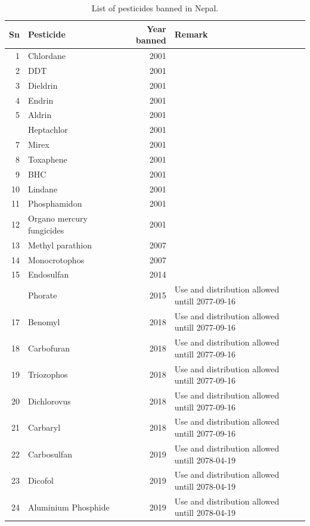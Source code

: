 \documentclass[
  openany]{book}
\begin{document}
\begin{table}

\caption{\label{tab:banned-pesticides}List of pesticides banned in Nepal.}
\centering
\begin{tabular}[t]{rlrl}
\toprule
Sn & Pesticide & Year banned & Remark\\
\midrule
\rowcolor{gray!6}  1 & Chlordane & 2001 & \\
2 & DDT & 2001 & \\
\rowcolor{gray!6}  3 & Dieldrin & 2001 & \\
4 & Endrin & 2001 & \\
\rowcolor{gray!6}  5 & Aldrin & 2001 & \\
\addlinespace
6 & Heptachlor & 2001 & \\
\rowcolor{gray!6}  7 & Mirex & 2001 & \\
8 & Toxaphene & 2001 & \\
\rowcolor{gray!6}  9 & BHC & 2001 & \\
10 & Lindane & 2001 & \\
\addlinespace
\rowcolor{gray!6}  11 & Phosphamidon & 2001 & \\
12 & Organo mercury fungicides & 2001 & \\
\rowcolor{gray!6}  13 & Methyl parathion & 2007 & \\
14 & Monocrotophos & 2007 & \\
\rowcolor{gray!6}  15 & Endosulfan & 2014 & \\
\addlinespace
16 & Phorate & 2015 & Use and distribution allowed untill 2077-09-16\\
\rowcolor{gray!6}  17 & Benomyl & 2018 & Use and distribution allowed untill 2077-09-16\\
18 & Carbofuran & 2018 & Use and distribution allowed untill 2077-09-16\\
\rowcolor{gray!6}  19 & Triozophos & 2018 & Use and distribution allowed untill 2077-09-16\\
20 & Dichlorovus & 2018 & Use and distribution allowed untill 2077-09-16\\
\addlinespace
\rowcolor{gray!6}  21 & Carbaryl & 2018 & Use and distribution allowed untill 2077-09-16\\
22 & Carbosulfan & 2019 & Use and distribution allowed untill 2078-04-19\\
\rowcolor{gray!6}  23 & Dicofol & 2019 & Use and distribution allowed untill 2078-04-19\\
24 & Aluminium Phosphide & 2019 & Use and distribution allowed untill 2078-04-19\\
\bottomrule
\end{tabular}
\end{table}
\end{document}
